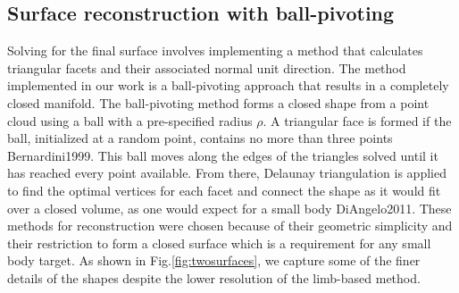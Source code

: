 \subsection{Surface reconstruction with ball-pivoting}

Solving for the final surface involves implementing a method that calculates triangular facets and their associated normal unit direction. The method implemented in our work is a ball-pivoting approach that results in a completely closed manifold. The ball-pivoting method forms a closed shape from a point cloud using a ball with a pre-specified radius $\rho$. A triangular face is formed if the ball, initialized at a random point, contains no more than three points {Bernardini1999}. This ball moves along the edges of the triangles solved until it has reached every point available. From there, Delaunay triangulation is applied to find the optimal vertices for each facet and connect the shape as it would fit over a closed volume, as one would expect for a small body {DiAngelo2011}. These methods for reconstruction were chosen because of their geometric simplicity and their restriction to form a closed surface which is a requirement for any small body target. As shown in Fig.\ref{fig:twosurfaces}, we capture some of the finer details of the shapes despite the lower resolution of the limb-based method. 
